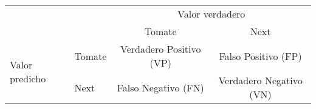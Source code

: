 \begin{tabular}{l|l|c|c|}
\multicolumn{2}{c}{}&\multicolumn{2}{c}{Valor verdadero}\\
\cline{3-4}
\multicolumn{2}{c|}{}&Tomate&Next\\ 
\cline{2-4}
\multirow{2}{*}{Valor predicho}& Tomate & Verdadero Positivo (VP) & Falso Positivo (FP)\\
\cline{2-4}
& Next & Falso Negativo (FN) & Verdadero Negativo (VN)\\
\cline{2-4}
\end{tabular}